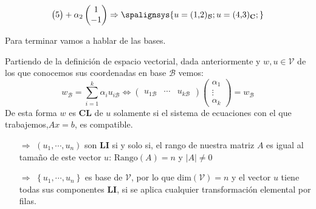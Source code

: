 \begin{enumerate}
\[\begin{pmatrix}
                              5
                      \end{pmatrix}
                      +\alpha_2
                      \begin{pmatrix}
                              1
                              \\
                              -1
                      \end{pmatrix}
                      \Rightarrow
                      \spalignsys{
                              u = (1\text{,}2)_\mathcal{B};
                              u = (4\text{,}3)_\mathbf{C};
                      }
              \]
\end{enumerate}
Para terminar vamos a hablar de las bases.
\par Partiendo de la definición de espacio vectorial, dada anteriormente y \(w,u \in \mathcal{V}\) de los que conocemos sus coordenadas en base \(\mathcal{B}\) vemos:
\[
        w_\mathcal{B} = \sum^k_{i=1}\alpha_i u_{i\mathcal{B}} \Leftrightarrow \begin{pmatrix}
                u_{1\mathcal{B}} & \cdots & u_{k\mathcal{B}}
        \end{pmatrix}
        \begin{pmatrix}
                \alpha_1 \\
                \vdots   \\
                \alpha_k
        \end{pmatrix}
        =w_\mathcal{B}
\]
De esta forma \(w\) es \textbf{CL} de \(u\) solamente si el sistema de ecuaciones con el que trabajemos,\(Ax=b\), es compatible.
\begin{itemize}
        \item[\(\Rightarrow\)] \(\left(u_1,\cdots,u_n\right) \) son \textbf{LI} si y solo si, el rango de nuestra matriz \(A\) es igual al tamaño de este vector \(u\): \(\text{Rango}\left(A\right) = n \) y \(\left\lvert A\right\rvert \neq 0\)
        \item[\(\Rightarrow\)] \(\left\{u_1,\cdots,u_n\right\} \) es base de \(\mathcal{V}\), por lo que \(\text{dim}\left(\mathcal{V}\right) = n \) y el vector \(u\) tiene todas sus componentes \textbf{LI}, si se aplica cualquier transformación elemental por filas.
\end{itemize}
